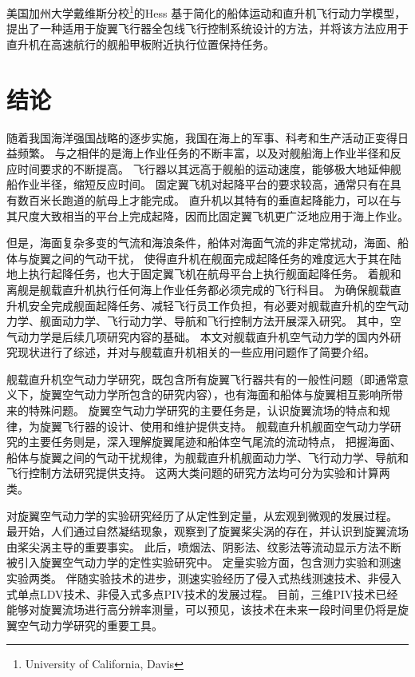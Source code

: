 \documentclass[doctor,openright,twoside,color]{buaathesis}
\begin{document}
美国加州大学戴维斯分校\footnote{University of California, Davis}的Hess
基于简化的船体运动和直升机飞行动力学模型，提出了一种适用于旋翼飞行器全包线飞行控制系统设计的方法，并将该方法应用于直升机在高速航行的舰船甲板附近执行位置保持任务。

\chapter{结论}
随着我国海洋强国战略的逐步实施，我国在海上的军事、科考和生产活动正变得日益频繁。
与之相伴的是海上作业任务的不断丰富，以及对舰船海上作业半径和反应时间要求的不断提高。
飞行器以其远高于舰船的运动速度，能够极大地延伸舰船作业半径，缩短反应时间。
固定翼飞机对起降平台的要求较高，通常只有在具有数百米长跑道的航母上才能完成。
直升机以其特有的垂直起降能力，可以在与其尺度大致相当的平台上完成起降，因而比固定翼飞机更广泛地应用于海上作业。

但是，海面复杂多变的气流和海浪条件，船体对海面气流的非定常扰动，海面、船体与旋翼之间的气动干扰，
使得直升机在舰面完成起降任务的难度远大于其在陆地上执行起降任务，也大于固定翼飞机在航母平台上执行舰面起降任务。
着舰和离舰是舰载直升机执行任何海上作业任务都必须完成的飞行科目。
为确保舰载直升机安全完成舰面起降任务、减轻飞行员工作负担，有必要对舰载直升机的空气动力学、舰面动力学、飞行动力学、导航和飞行控制方法开展深入研究。
其中，空气动力学是后续几项研究内容的基础。
本文对舰载直升机空气动力学的国内外研究现状进行了综述，并对与舰载直升机相关的一些应用问题作了简要介绍。

舰载直升机空气动力学研究，既包含所有旋翼飞行器共有的一般性问题（即通常意义下，旋翼空气动力学所包含的研究内容），也有海面和船体与旋翼相互影响所带来的特殊问题。
旋翼空气动力学研究的主要任务是，认识旋翼流场的特点和规律，为旋翼飞行器的设计、使用和维护提供支持。
舰载直升机舰面空气动力学研究的主要任务则是，深入理解旋翼尾迹和船体空气尾流的流动特点，
把握海面、船体与旋翼之间的气动干扰规律，为舰载直升机舰面动力学、飞行动力学、导航和飞行控制方法研究提供支持。
这两大类问题的研究方法均可分为实验和计算两类。

对旋翼空气动力学的实验研究经历了从定性到定量，从宏观到微观的发展过程。
最开始，人们通过自然凝结现象，观察到了旋翼桨尖涡的存在，并认识到旋翼流场由桨尖涡主导的重要事实。
此后，喷烟法、阴影法、纹影法等流动显示方法不断被引入旋翼空气动力学的定性实验研究中。
定量实验方面，包含测力实验和测速实验两类。
伴随实验技术的进步，测速实验经历了侵入式热线测速技术、非侵入式单点LDV技术、非侵入式多点PIV技术的发展过程。
目前，三维PIV技术已经能够对旋翼流场进行高分辨率测量，可以预见，该技术在未来一段时间里仍将是旋翼空气动力学研究的重要工具。
\end{document}
